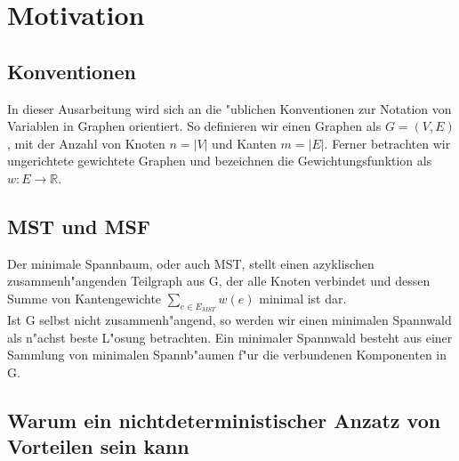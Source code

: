 \section{Motivation}

\subsection{Konventionen}
In dieser Ausarbeitung wird sich an die "ublichen Konventionen zur Notation
    von Variablen in Graphen orientiert. So definieren wir einen Graphen als
    $G = (V,E)$, mit der Anzahl von Knoten $n = |V|$ und Kanten $m = |E|$.
    Ferner betrachten wir ungerichtete gewichtete Graphen und bezeichnen 
    die Gewichtungsfunktion als $w: E \rightarrow \mathbb{R}$.\\

\subsection{MST und MSF}
Der minimale Spannbaum, oder auch MST, stellt einen azyklischen 
    zusammenh"angenden Teilgraph aus G, der alle Knoten verbindet und
    dessen Summe von Kantengewichte $\sum_{e \in E_{MST}} w(e)$
    minimal ist dar.\\
Ist G selbst nicht zusammenh"angend, so werden wir einen minimalen Spannwald
    als n"achst beste L"osung betrachten.
    Ein minimaler Spannwald besteht aus einer Sammlung von minimalen 
    Spannb"aumen f"ur die verbundenen Komponenten in G.\\

\subsection{Warum ein nichtdeterministischer Anzatz von Vorteilen sein kann}

